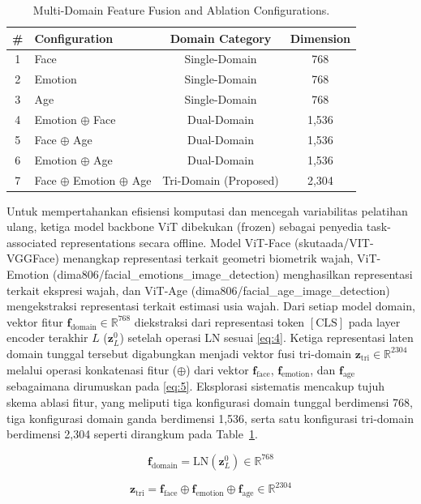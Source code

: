 \begin{table}[htbp]
\caption{Multi-Domain Feature Fusion and Ablation Configurations.}
\label{tab:II}
\centering
\begin{tabular}{clcc}
\toprule
\# & Configuration & Domain Category & Dimension \\
\midrule
1 & Face & Single-Domain & 768 \\
2 & Emotion & Single-Domain & 768 \\
3 & Age & Single-Domain & 768 \\
4 & Emotion $\oplus$ Face & Dual-Domain & 1,536 \\
5 & Face $\oplus$ Age & Dual-Domain & 1,536 \\
6 & Emotion $\oplus$ Age & Dual-Domain & 1,536 \\
7 & Face $\oplus$ Emotion $\oplus$ Age & Tri-Domain (Proposed) & 2,304 \\
\bottomrule
\end{tabular}
\end{table}

Untuk mempertahankan efisiensi komputasi dan mencegah variabilitas pelatihan ulang, ketiga model backbone ViT dibekukan (frozen) sebagai penyedia task-associated representations secara offline. Model ViT-Face (skutaada/\allowbreak VIT-\allowbreak VGGFace) menangkap representasi terkait geometri biometrik wajah, ViT-Emotion (dima806/\allowbreak facial\_\allowbreak emotions\_\allowbreak image\_\allowbreak detection) menghasilkan representasi terkait ekspresi wajah, dan ViT-Age (dima806/\allowbreak facial\_\allowbreak age\_\allowbreak image\_\allowbreak detection) mengekstraksi representasi terkait estimasi usia wajah. Dari setiap model domain, vektor fitur $\mathbf{f}_{\text{domain}} \in \mathbb{R}^{768}$ diekstraksi dari representasi token $[\text{CLS}]$ pada layer encoder terakhir $L$ ($\mathbf{z}_L^0$) setelah operasi LN sesuai \eqref{eq:4}. Ketiga representasi laten domain tunggal tersebut digabungkan menjadi vektor fusi tri-domain $\mathbf{z}_{\text{tri}} \in \mathbb{R}^{2304}$ melalui operasi konkatenasi fitur ($\oplus$) dari vektor $\mathbf{f}_{\text{face}}$, $\mathbf{f}_{\text{emotion}}$, dan $\mathbf{f}_{\text{age}}$ sebagaimana dirumuskan pada \eqref{eq:5}. Eksplorasi sistematis mencakup tujuh skema ablasi fitur, yang meliputi tiga konfigurasi domain tunggal berdimensi 768, tiga konfigurasi domain ganda berdimensi 1,536, serta satu konfigurasi tri-domain berdimensi 2,304 seperti dirangkum pada Table~\ref{tab:II}.

\begin{equation}
\mathbf{f}_{\text{domain}} = \text{LN}(\mathbf{z}_L^0) \in \mathbb{R}^{768}
\label{eq:4}
\end{equation}

\begin{equation}
\mathbf{z}_{\text{tri}} = \mathbf{f}_{\text{face}} \oplus \mathbf{f}_{\text{emotion}} \oplus \mathbf{f}_{\text{age}} \in \mathbb{R}^{2304}
\label{eq:5}
\end{equation}
